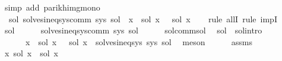 \begin{isabellebody}
\ {\isacharparenleft}{\kern0pt}simp\ add{\isacharcolon}{\kern0pt}\ parikh{\isacharunderscore}{\kern0pt}img{\isacharunderscore}{\kern0pt}mono{\isacharparenright}{\kern0pt}\isanewline
\ \ \isamarkupfalse%
\ {\isachardoublequoteopen}\ {\isasymforall}sol{\isacharprime}{\kern0pt}{\isachardot}{\kern0pt}\ solves{\isacharunderscore}{\kern0pt}ineq{\isacharunderscore}{\kern0pt}sys{\isacharunderscore}{\kern0pt}comm\ sys\ sol{\isacharprime}{\kern0pt}\ {\isasymlongrightarrow}\ {\isacharparenleft}{\kern0pt}{\isasymforall}x{\isachardot}{\kern0pt}\ {\isasymPsi}\ {\isacharparenleft}{\kern0pt}sol\ x{\isacharparenright}{\kern0pt}\ {\isasymsubseteq}\ {\isasymPsi}\ {\isacharparenleft}{\kern0pt}sol{\isacharprime}{\kern0pt}\ x{\isacharparenright}{\kern0pt}{\isacharparenright}{\kern0pt}{\isachardoublequoteclose}\isanewline
\ \ \isamarkupfalse%
\ {\isacharparenleft}{\kern0pt}rule\ allI{\isacharcomma}{\kern0pt}\ rule\ impI{\isacharparenright}{\kern0pt}\isanewline
\ \ \ \ \isamarkupfalse%
\ sol{\isacharprime}{\kern0pt}\isanewline
\ \ \ \ \isamarkupfalse%
\ {\isachardoublequoteopen}solves{\isacharunderscore}{\kern0pt}ineq{\isacharunderscore}{\kern0pt}sys{\isacharunderscore}{\kern0pt}comm\ sys\ sol{\isacharprime}{\kern0pt}{\isachardoublequoteclose}\isanewline
\ \ \ \ \isamarkupfalse%
\ sol{\isacharunderscore}{\kern0pt}comm{\isacharunderscore}{\kern0pt}sol\ \isamarkupfalse%
\ sol{\isacharprime}{\kern0pt}{\isacharprime}{\kern0pt}\ \ sol{\isacharprime}{\kern0pt}{\isacharprime}{\kern0pt}{\isacharunderscore}{\kern0pt}intro{\isacharcolon}{\kern0pt}\isanewline
\ \ \ \ \ \ {\isachardoublequoteopen}{\isacharparenleft}{\kern0pt}{\isasymforall}x{\isachardot}{\kern0pt}\ {\isasymPsi}\ {\isacharparenleft}{\kern0pt}sol{\isacharprime}{\kern0pt}\ x{\isacharparenright}{\kern0pt}\ {\isacharequal}{\kern0pt}\ {\isasymPsi}\ {\isacharparenleft}{\kern0pt}sol{\isacharprime}{\kern0pt}{\isacharprime}{\kern0pt}\ x{\isacharparenright}{\kern0pt}{\isacharparenright}{\kern0pt}\ {\isasymand}\ solves{\isacharunderscore}{\kern0pt}ineq{\isacharunderscore}{\kern0pt}sys\ sys\ sol{\isacharprime}{\kern0pt}{\isacharprime}{\kern0pt}{\isachardoublequoteclose}\ \isamarkupfalse%
\ meson\isanewline
\ \ \ \ \isamarkupfalse%
\ assms\ \isamarkupfalse%
\ {\isachardoublequoteopen}{\isasymforall}x{\isachardot}{\kern0pt}\ sol\ x\ {\isasymsubseteq}\ sol{\isacharprime}{\kern0pt}{\isacharprime}{\kern0pt}\ x{\isachardoublequoteclose}\ \isamarkupfalse%

\end{isabellebody}
